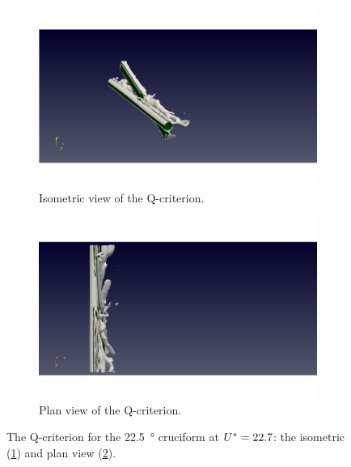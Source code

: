 \documentclass[oneside]{utmthesis}
\begin{document}
\begin{figure}
  \centering
  \begin{subfigure}[h]{0.9\textwidth}
    \includegraphics[width=\textwidth]{figs/qIso225U10}
    \caption{Isometric view of the Q-criterion.}
    \label{fig:qIso225U10}
  \end{subfigure}

  \begin{subfigure}[h]{0.9\textwidth}
    \includegraphics[width=\textwidth]{figs/qTop225U10}
    \caption{Plan view of the Q-criterion.}
    \label{fig:qTop225U10}
  \end{subfigure}

  \caption{The Q-criterion for the \SI{22.5}{\degree} cruciform at $U^{*} = 22.7$: the isometric (\ref{fig:qIso225U10}) and plan view (\ref{fig:qTop225U10}).} \label{fig:qCrit225U10}
\end{figure}
\end{document}
